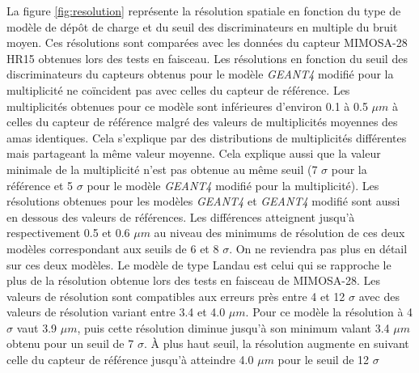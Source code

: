    La figure \ref{fig:resolution} repr\'esente la r\'esolution spatiale en fonction du type de mod\`ele de d\'ep\^ot de charge et du seuil des discriminateurs en multiple du bruit moyen. Ces r\'esolutions sont compar\'ees avec les donn\'ees du capteur MIMOSA-28 HR15 obtenues lors des tests en faisceau. Les r\'esolutions en fonction du seuil des discriminateurs du capteurs obtenus pour le mod\`ele \textit{GEANT4} modifi\'e pour la multiplicit\'e ne co\"incident pas avec celles du capteur de r\'ef\'erence. Les multiplicit\'es obtenues pour ce mod\`ele sont inf\'erieures d'environ 0.1 \`a 0.5 $\mu m$ \`a celles du capteur de r\'ef\'erence malgr\'e des valeurs de multiplicit\'es moyennes des amas identiques. Cela s'explique par des distributions de multiplicit\'es diff\'erentes mais partageant la m\^eme valeur moyenne. Cela explique aussi que la valeur minimale de la multiplicit\'e n'est pas obtenue au m\^eme seuil (7 $\sigma$ pour la r\'ef\'erence et 5 $\sigma$ pour le mod\`ele \textit{GEANT4} modifi\'e pour la multiplicit\'e). Les r\'esolutions obtenues pour les mod\`eles \textit{GEANT4} et \textit{GEANT4} modifi\'e sont aussi en dessous des valeurs de r\'ef\'erences. Les diff\'erences atteignent jusqu'\`a respectivement 0.5 et 0.6 $\mu m$ au niveau des minimums de r\'esolution de ces deux mod\`eles correspondant aux seuils de 6 et 8 $\sigma$. On ne reviendra pas plus en d\'etail sur ces deux mod\`eles. Le mod\`ele de type Landau est celui qui se rapproche le plus de la r\'esolution obtenue lors des tests en faisceau de MIMOSA-28. Les valeurs de r\'esolution sont compatibles aux erreurs pr\`es entre 4 et 12 $\sigma$ avec des valeurs de r\'esolution variant entre 3.4 et 4.0 $\mu m$. Pour ce mod\`ele la r\'esolution \`a 4 $\sigma$ vaut 3.9 $\mu m$, puis cette r\'esolution diminue jusqu'à son minimum valant 3.4 $\mu m$ obtenu pour un seuil de 7 $\sigma$. \`A plus haut seuil, la r\'esolution augmente en suivant celle du capteur de r\'ef\'erence jusqu'\`a atteindre 4.0 $\mu m$ pour le seuil de 12 $\sigma$
   
